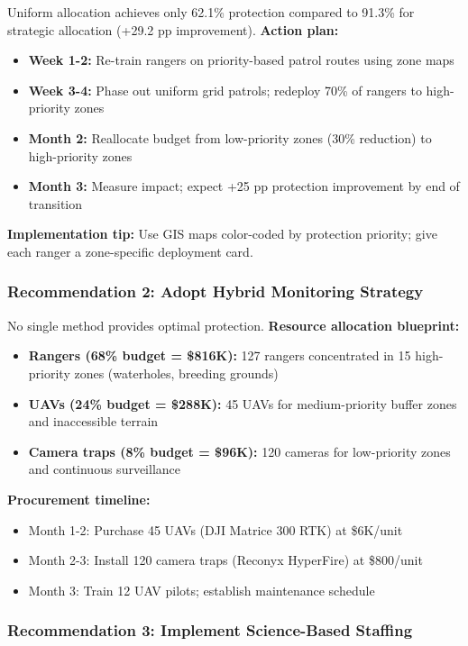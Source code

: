 Uniform allocation achieves only 62.1\% protection compared to 91.3\% for strategic allocation (+29.2 pp improvement). \textbf{Action plan:}
\begin{itemize}
    \item \textbf{Week 1-2:} Re-train rangers on priority-based patrol routes using zone maps
    \item \textbf{Week 3-4:} Phase out uniform grid patrols; redeploy 70\% of rangers to high-priority zones
    \item \textbf{Month 2:} Reallocate budget from low-priority zones (30\% reduction) to high-priority zones
    \item \textbf{Month 3:} Measure impact; expect +25 pp protection improvement by end of transition
\end{itemize}

\textbf{Implementation tip:} Use GIS maps color-coded by protection priority; give each ranger a zone-specific deployment card.

\subsubsection{Recommendation 2: Adopt Hybrid Monitoring Strategy}

No single method provides optimal protection. \textbf{Resource allocation blueprint:}
\begin{itemize}
    \item \textbf{Rangers (68\% budget = \$816K):} 127 rangers concentrated in 15 high-priority zones (waterholes, breeding grounds)
    \item \textbf{UAVs (24\% budget = \$288K):} 45 UAVs for medium-priority buffer zones and inaccessible terrain
    \item \textbf{Camera traps (8\% budget = \$96K):} 120 cameras for low-priority zones and continuous surveillance
\end{itemize}

\textbf{Procurement timeline:}
\begin{itemize}
    \item Month 1-2: Purchase 45 UAVs (DJI Matrice 300 RTK) at \$6K/unit
    \item Month 2-3: Install 120 camera traps (Reconyx HyperFire) at \$800/unit
    \item Month 3: Train 12 UAV pilots; establish maintenance schedule
\end{itemize}

\subsubsection{Recommendation 3: Implement Science-Based Staffing}

